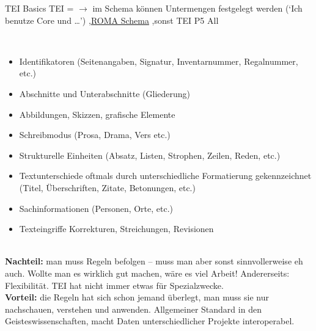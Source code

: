 \begin{frame}[allowframebreaks]{TEI Basics}
\footnotesize
TEI =  $\to$ im Schema können Untermengen festgelegt werden (`Ich benutze Core und \dots ') \sep \href{http://www.tei-c.org/Roma/}{ROMA Schema} \sep sonst TEI P5 All
\smallskip

 \\

\begin{itemize}\footnotesize
    \item Identifikatoren (Seitenangaben, Signatur, Inventarnummer, Regalnummer, etc.)
    \item Abschnitte und Unterabschnitte (Gliederung)
    \item Abbildungen, Skizzen, grafische Elemente
    \item Schreibmodus (Prosa, Drama, Vers etc.)
    \item Strukturelle Einheiten (Absatz, Listen, Strophen, Zeilen, Reden, etc.)
    \item Textunterschiede oftmals durch unterschiedliche Formatierung gekennzeichnet (Titel, Überschriften, Zitate, Betonungen, etc.)
    \item Sachinformationen (Personen, Orte, etc.)
    \item Texteingriffe Korrekturen, Streichungen, Revisionen
\end{itemize}
\vspace{1em}

 \\
\textbf{Nachteil:} man muss Regeln befolgen -- muss man aber sonst sinnvollerweise eh auch. Wollte man es wirklich gut machen, wäre es viel Arbeit! Andererseits: Flexibilität. TEI hat nicht immer etwas für Spezialzwecke. \\
\textbf{Vorteil:} die Regeln hat sich schon jemand überlegt, man muss sie nur nachschauen, verstehen und anwenden. Allgemeiner Standard in den Geisteswissenschaften, macht Daten unterschiedlicher Projekte interoperabel.
\end{frame}


